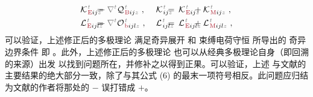 \begin{subequations}
\begin{align}
	&{\mathcal{K}}^{\;\!\mathcolor{gray}{t}}_{\;\!\textcolor{Maroon}{\text{E}} ij \mathcolor{gray}{z}} \hspace{-2.0em}&&=\hspace{0.2em} &&\hspace{-2.0em}- \mathcolor{gray}{\nabla^t} {\mathcal{Q}}^{\;\!\mathcolor{gray}{t}}_{\;\!\textcolor{Maroon}{\text{B}} ij \mathcolor{gray}{z}}~, &&\hspace{0.3em} {\mathcal{K}}^{\;\!\mathcolor{gray}{t}}_{\;\! ij \mathcolor{gray}{z}} \hspace{-2.0em}&&=\hspace{0.2em} {\mathcal{K}}^{\;\!\mathcolor{gray}{t}}_{\;\!\textcolor{Maroon}{\text{E}} ij \mathcolor{gray}{z}} &&\hspace{-2.0em}+ {\mathcal{K}}^{\;\!\mathcolor{gray}{t}}_{\;\!\textcolor{Maroon}{\text{M}} ij \mathcolor{gray}{z}}~, \label{eq:KE-Kb} \\
	&{\mathcal{L}}^{\;\!\mathcolor{gray}{t}}_{\;\!\textcolor{Maroon}{\text{E}} ijl \mathcolor{gray}{z}} \hspace{-2.0em}&&=\hspace{0.2em} &&\hspace{-2.0em}- \mathcolor{gray}{\nabla^t} {\mathcal{O}}^{\;\!\mathcolor{gray}{t}}_{\;\!\textcolor{Maroon}{\text{b}} ijl \mathcolor{gray}{z}}~, &&\hspace{0.3em} {\mathcal{L}}^{\;\!\mathcolor{gray}{t}}_{\;\! ijl \mathcolor{gray}{z}} \hspace{-2.0em}&&=\hspace{0.2em} {\mathcal{L}}^{\;\!\mathcolor{gray}{t}}_{\;\!\textcolor{Maroon}{\text{E}} ijl \mathcolor{gray}{z}} &&\hspace{-2.0em}+ {\mathcal{L}}^{\;\!\mathcolor{gray}{t}}_{\;\!\textcolor{Maroon}{\text{M}} ijl \mathcolor{gray}{z}}~, \label{eq:LE-Lb}
\end{align}
\end{subequations}
可以验证，上述修正后的多极理论  满足奇异展开  和 束缚电荷守恒  所导出的 奇异边界条件  即 。此外，上述修正后的多极理论  也可以从经典多极理论自身（即回溯  的来源）出发\cite{raabMultipoleTheoryElectromagnetism2004,delangeElectromagneticBoundaryConditions2013} 以找到问题所在，并修补之以得到正果。可以验证，上述  与文献\cite{delangeElectromagneticBoundaryConditions2013}的主要结果的绝大部分一致，除了与其公式 (6) 的最末一项符号相反。此问题应归结为文献\cite{delangeElectromagneticBoundaryConditions2013}的作者将那处的 $-$ 误打错成 $+$。

